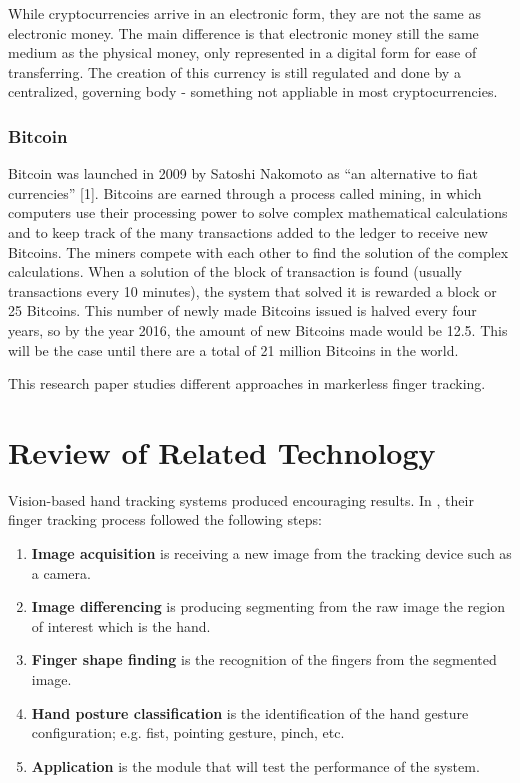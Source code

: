 \documentclass{acm_proc_article-sp}
\begin{document}
While cryptocurrencies arrive in an electronic form, they are not the same as electronic money. The main difference is that electronic money still the same medium as the physical money, only represented in a digital form for ease of transferring. The creation of this currency is still regulated and done by a centralized, governing body - something not appliable in most cryptocurrencies.


\subsubsection{Bitcoin}

Bitcoin was launched in 2009 by Satoshi Nakomoto as “an alternative to fiat currencies” [1]. Bitcoins are earned through a process called mining, in which computers use their processing power to solve complex mathematical calculations and to keep track of the many transactions added to the ledger to receive new Bitcoins. The miners compete with each other to find the solution of the complex calculations.  When a solution of the block of transaction is found (usually transactions every 10 minutes), the system that solved it is rewarded a block or 25 Bitcoins. This number of newly made Bitcoins issued is halved every four years, so by the year 2016, the amount of new Bitcoins made would be 12.5. This will be the case until there are a total of 21 million Bitcoins in the world.

This research paper studies different approaches in markerless finger tracking.


\section{Review of Related Technology}
Vision-based hand tracking systems \cite{HurstWolfgangVanWezel:2013, HurstWolfgangVriens:2013} produced encouraging results. In \cite{Hardenberg:2001}, their finger tracking process followed the following steps:

\begin{enumerate}
	\item \textbf{Image acquisition} is receiving a new image from the tracking device such as a camera.
	\item \textbf{Image differencing} is producing segmenting from the raw image the region of interest which is the hand.
	\item \textbf{Finger shape finding} is the recognition of the fingers from the segmented image. 
	\item \textbf{Hand posture classification} is the identification of the hand gesture configuration; e.g. fist, pointing gesture, pinch, etc.
	\item \textbf{Application} is the module that will test the performance of the system.
\end{enumerate}
\end{document}
